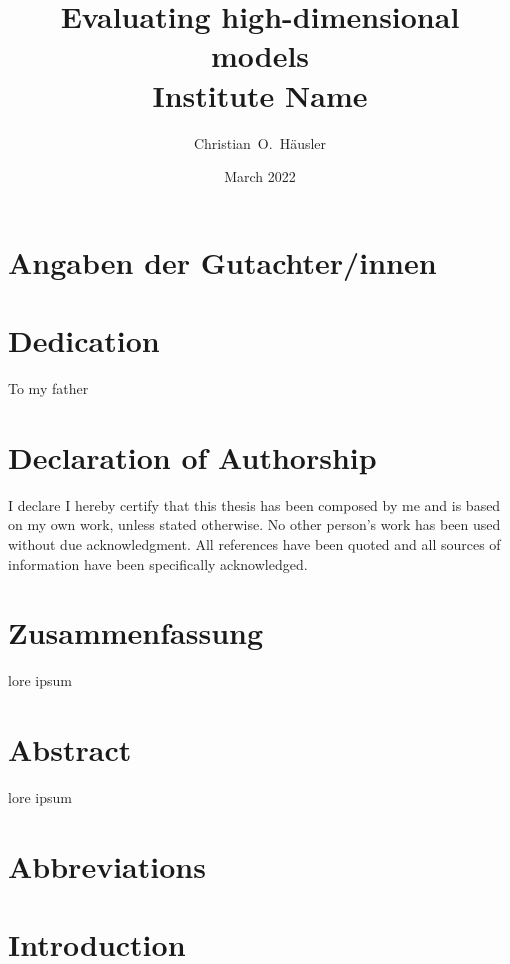 \documentclass[english,12pt]{report}
\title{
    {Evaluating high-dimensional models}\\
    {\large Institute Name}\\
}
\author{Christian~O.~Häusler}
\date{March 2022}
\begin{document}


\maketitle


\chapter*{Angaben der Gutachter/innen}


\chapter*{Dedication}
To my father


\chapter*{Declaration of Authorship}
%
I declare I hereby certify that this thesis has been composed by me and is based
on my own work, unless stated otherwise. No other person’s work has been used
without due acknowledgment. All references have been quoted and all sources of
information have been specifically acknowledged.


\chapter*{Zusammenfassung}
\setcounter{page}{1}

lore ipsum


\chapter*{Abstract}
lore ipsum


\chapter*{Abbreviations}
%

\tableofcontents


\chapter{Introduction}

\setcounter{page}{1}

% 
\end{document}
